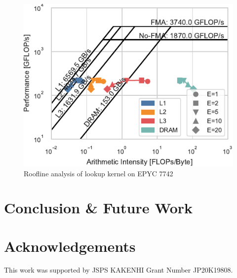 \documentclass[conference]{IEEEtran}
\begin{document}
\begin{figure}
    \centering
    \includegraphics{figs/roofline_lookup_epyc}
    \caption{Roofline analysis of lookup kernel on EPYC 7742}%
    \label{fig:architecture}
\end{figure}

\section{Conclusion \& Future Work}

\section*{Acknowledgements}
This work was supported by JSPS KAKENHI Grant Number JP20K19808.



\end{document}
